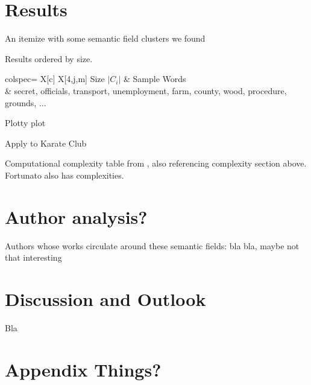 \documentclass[12pt, a4paper]{article}
\begin{document}
  \section{Results}
  An itemize with some semantic field clusters we found

  \begin{table}
    \centering
    \caption{Results ordered by size.}
    \begin{tblr}{colspec={ X[c] X[4,j,m] }}
      \hline
      Size $|C_i|$ & Sample Words                                                                            \\
              & secret, officials, transport, unemployment, farm, county, wood, procedure, grounds, ... \\
    \end{tblr}
  \end{table}

  Plotty plot

  Apply to Karate Club

  Computational complexity table from \cite{watset}, also referencing complexity section above. Fortunato also has complexities.

  \section{Author analysis?}
  Authors whose works circulate around these semantic fields:
  bla bla, maybe not that interesting

  \pagebreak
  \section{Discussion and Outlook}
  Bla

  \pagebreak
  \printbibliography

  \appendix
  \section{Appendix Things?}
\end{document}
